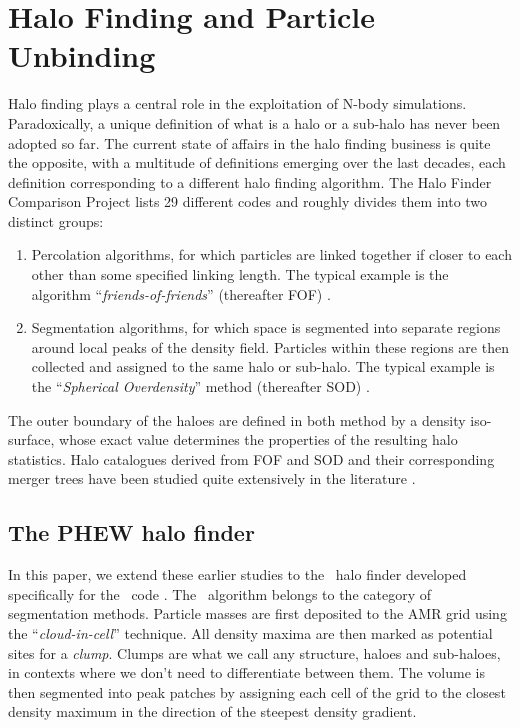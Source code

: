 \section{Halo Finding and Particle Unbinding}\label{chap:phew}

Halo finding plays a central role in the exploitation of N-body
simulations. Paradoxically, a unique definition of what is a halo or a
sub-halo has never been adopted so far.  The current state of affairs
in the halo finding business is quite the opposite, with a multitude
of definitions emerging over the last decades, each definition
corresponding to a different halo finding algorithm.  The Halo Finder
Comparison Project \citep{MAD} lists 29 different codes and roughly
divides them into two distinct groups:
\begin{enumerate}
\item Percolation algorithms, for which particles are linked together
  if closer to each other than some specified linking length. The
  typical example is the algorithm ``\emph{friends-of-friends}''
  (thereafter FOF) \citep{FOF}.
\item Segmentation algorithms, for which space is segmented into
  separate regions around local peaks of the density field. Particles
  within these regions are then collected and assigned to the same
  halo or sub-halo. The typical example is the ``\emph{Spherical
  Overdensity}'' method (thereafter SOD) \citep{SO}.
\end{enumerate}
The outer boundary of the haloes are defined in both method by a
density iso-surface, whose exact value determines the properties of
the resulting halo statistics.  Halo catalogues derived from FOF and
SOD and their corresponding merger trees have been studied quite
extensively in the literature \citep[see e.g.][]{SUSSING_HALOFINDER}.

\subsection{The PHEW halo finder}

In this paper, we extend these earlier studies to the \phew\ halo
finder \citep{PHEW} developed specifically for the \ramses\ code
\citep{ramses}.  The \phew\ algorithm belongs to the category of
segmentation methods.  Particle masses are first deposited to the AMR
grid using the ``\emph{cloud-in-cell}'' technique. All density maxima
are then marked as potential sites for a \emph{clump}. Clumps are what
we call any structure, haloes and sub-haloes, in contexts where we
don't need to differentiate between them. The volume is then segmented
into peak patches by assigning each cell of the grid to the closest
density maximum in the direction of the steepest density gradient.

